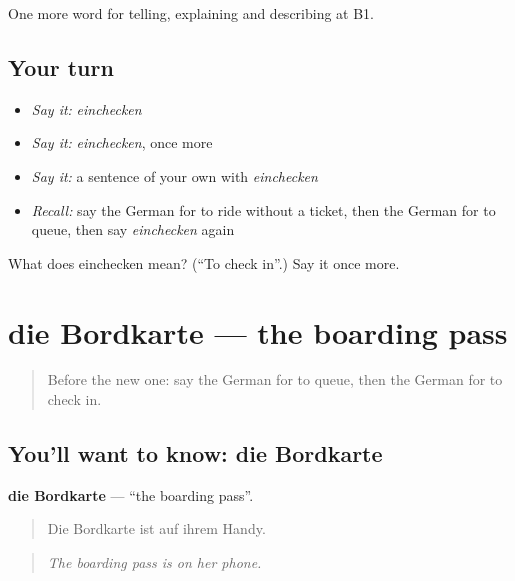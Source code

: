 \begin{grammarlens}[title={What you've built}]
One more word for telling, explaining and describing at B1.
\end{grammarlens}

\subsection*{Your turn}
\begin{itemize}
\raggedright
  \item \emph{Say it:} \emph{einchecken}
  \item \emph{Say it:} \emph{einchecken}, once more
  \item \emph{Say it:} a sentence of your own with \emph{einchecken}
  \item \emph{Recall:} say the German for to ride without a ticket, then the German for to queue, then say \emph{einchecken} again
\end{itemize}

\begin{tcolorbox}[breakable,colback=teal!4,colframe=teal!35!black,title={Before you move on}]
What does einchecken mean? (\textquotedblleft{}To check in\textquotedblright{}.) Say it once more.
\end{tcolorbox}
\section[die Bordkarte]{die Bordkarte — the boarding pass}

\label{lesson:GE-C416-bordkarte}



\begin{quote}
Before the new one: say the German for to queue, then the German for to check in.
\end{quote}

\subsection*{You'll want to know: die Bordkarte}
\textbf{die Bordkarte} — \textquotedblleft{}the boarding pass\textquotedblright{}.

\begin{quote}
Die Bordkarte ist auf ihrem Handy.
\end{quote}

\begin{quote}
\emph{The boarding pass is on her phone.}
\end{quote}

